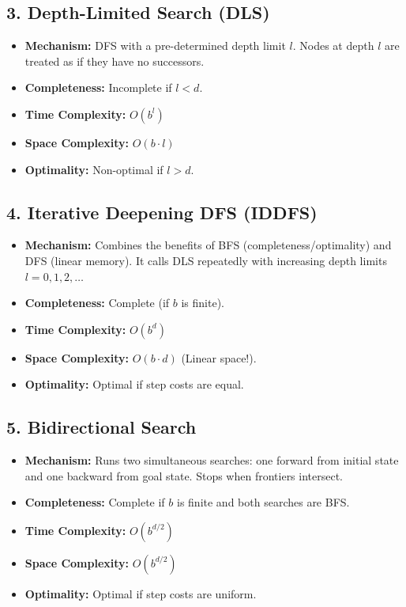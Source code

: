 \documentclass[12pt,a4paper]{article}
\begin{document}
\subsection{3. Depth-Limited Search (DLS)}
\begin{itemize}[leftmargin=*, itemsep=3pt]
  \item \textbf{Mechanism:} DFS with a pre-determined depth limit $l$. Nodes at depth $l$ are treated as if they have no successors.
  \item \textbf{Completeness:} Incomplete if $l < d$.
  \item \textbf{Time Complexity:} $O(b^l)$
  \item \textbf{Space Complexity:} $O(b \cdot l)$
  \item \textbf{Optimality:} Non-optimal if $l > d$.
\end{itemize}

\subsection{4. Iterative Deepening DFS (IDDFS)}
\begin{itemize}[leftmargin=*, itemsep=3pt]
  \item \textbf{Mechanism:} Combines the benefits of BFS (completeness/optimality) and DFS (linear memory). It calls DLS repeatedly with increasing depth limits $l = 0, 1, 2, \dots$
  \item \textbf{Completeness:} Complete (if $b$ is finite).
  \item \textbf{Time Complexity:} $O(b^d)$
  \item \textbf{Space Complexity:} $O(b \cdot d)$ (Linear space!).
  \item \textbf{Optimality:} Optimal if step costs are equal.
\end{itemize}

\subsection{5. Bidirectional Search}
\begin{itemize}[leftmargin=*, itemsep=3pt]
  \item \textbf{Mechanism:} Runs two simultaneous searches: one forward from initial state and one backward from goal state. Stops when frontiers intersect.
  \item \textbf{Completeness:} Complete if $b$ is finite and both searches are BFS.
  \item \textbf{Time Complexity:} $O(b^{d/2})$
  \item \textbf{Space Complexity:} $O(b^{d/2})$
  \item \textbf{Optimality:} Optimal if step costs are uniform.
\end{itemize}
\end{document}
